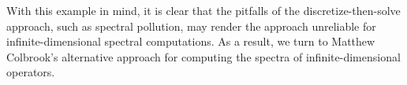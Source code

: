 With this example in mind, it is clear that the pitfalls of the discretize-then-solve approach, such as spectral pollution, may render the approach unreliable for infinite-dimensional spectral computations. As a result, we turn to Matthew Colbrook's alternative approach for computing the spectra of infinite-dimensional operators. 









